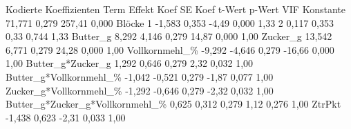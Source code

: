 Kodierte Koeffizienten
Term	Effekt	Koef	SE Koef	t-Wert	p-Wert	VIF
Konstante	 	71,771	0,279	257,41	0,000	 
Blöcke	 	 	 	 	 	 
  1	 	-1,583	0,353	-4,49	0,000	1,33
  2	 	0,117	0,353	0,33	0,744	1,33
Butter\_g	8,292	4,146	0,279	14,87	0,000	1,00
Zucker\_g	13,542	6,771	0,279	24,28	0,000	1,00
Vollkornmehl\_\%	-9,292	-4,646	0,279	-16,66	0,000	1,00
Butter\_g*Zucker\_g	1,292	0,646	0,279	2,32	0,032	1,00
Butter\_g*Vollkornmehl\_\%	-1,042	-0,521	0,279	-1,87	0,077	1,00
Zucker\_g*Vollkornmehl\_\%	-1,292	-0,646	0,279	-2,32	0,032	1,00
Butter\_g*Zucker\_g*Vollkornmehl\_\%	0,625	0,312	0,279	1,12	0,276	1,00
ZtrPkt	 	-1,438	0,623	-2,31	0,033	1,00
